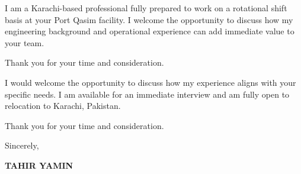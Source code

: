 \documentclass[11pt,a4paper]{article}
\begin{document}
I am a Karachi-based professional fully prepared to work on a rotational shift basis at your Port Qasim facility. I welcome the opportunity to discuss how my engineering background and operational experience can add immediate value to your team.

Thank you for your time and consideration.

I would welcome the opportunity to discuss how my experience aligns with your specific needs. I am available for an immediate interview and am fully open to relocation to Karachi, Pakistan.

Thank you for your time and consideration.

\vspace{0.5cm}
Sincerely,

\vspace{0.5cm}
\textbf{TAHIR YAMIN}
\end{document}
